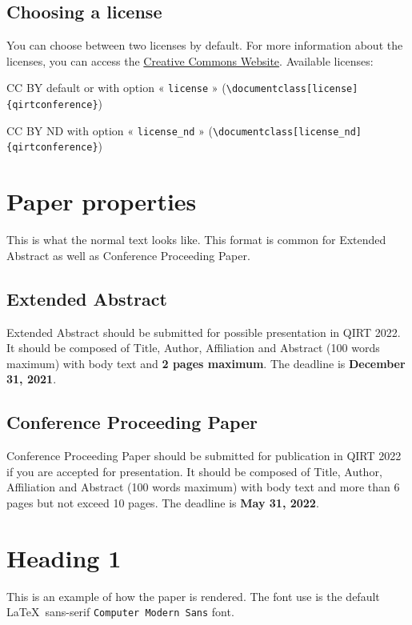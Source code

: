 \documentclass[license]{qirtconference}
\begin{document}
\subsection{Choosing a license}
You can choose between two licenses by default. For more information about the licenses, you can access the \href{https://creativecommons.org}{Creative Commons Website}. Available licenses:
\begin{itemize*}
\item CC BY default or with option « \verb~license~ » (\verb~\documentclass[license]{qirtconference}~)
\item CC BY ND with option « \verb~license_nd~ » (\verb~\documentclass[license_nd]{qirtconference}~)
\end{itemize*}

\section{Paper properties}

This is what the normal text looks like. This format is common for Extended Abstract as well as Conference Proceeding Paper.

\subsection{Extended Abstract}
Extended Abstract should be submitted for possible presentation in QIRT 2022. It should be composed of Title, Author, Affiliation and Abstract (100 words maximum) with body text and \textbf{2 pages maximum}. The deadline is \textbf{December 31, 2021}.

\subsection{Conference Proceeding Paper}
Conference Proceeding Paper should be submitted for publication in QIRT 2022 if you are accepted for presentation. It should be composed of Title, Author, Affiliation and Abstract (100 words maximum) with body text and more than 6 pages but not exceed 10 pages. The deadline is \textbf{May 31, 2022}.

\section{Heading 1}

This is an example of how the paper is rendered. The font use is the default \LaTeX\ sans-serif \verb~Computer Modern Sans~ font.
\end{document}
